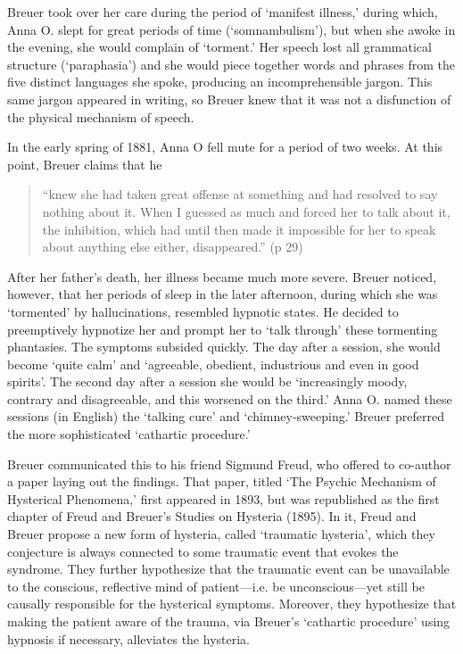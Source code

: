 Breuer took over her care during the period of `manifest illness,' during which, Anna O. slept for great periods of time (`somnambulism'), but when she awoke in the evening, she would complain of `torment.' Her speech lost all grammatical structure (`paraphasia') and she would piece together words and phrases from the five distinct languages she spoke, producing an incomprehensible jargon. This same jargon appeared in writing, so Breuer knew that it was not a disfunction of the physical mechanism of speech.

In the early spring of 1881, Anna O fell mute for a period of two weeks. At this point, Breuer claims that he 

\begin{quote}

``knew she had taken great offense at something and had resolved to say nothing about it. When I guessed as much and forced her to talk about it, the inhibition, which had until then made it impossible for her to speak about anything else either, disappeared.'' (p 29)
\end{quote}

After her father's death, her illness became much more severe. Breuer noticed, however, that her periods of sleep in the later afternoon, during which she was `tormented' by hallucinations, resembled hypnotic states. He decided to preemptively hypnotize her and prompt her to `talk through' these tormenting phantasies. The symptoms subsided quickly. The day after a session, she would become `quite calm' and `agreeable, obedient, industrious and even in good spirits'. The second day after a session she would be `increasingly moody, contrary and disagreeable, and this worsened on the third.' Anna O. named these sessions (in English) the `talking cure' and `chimney-sweeping.' Breuer preferred the more sophisticated `cathartic procedure.'

Breuer communicated this to his friend Sigmund Freud, who offered to co-author a paper laying out the findings. That paper, titled `The Psychic Mechanism of Hysterical Phenomena,' first appeared in 1893, but was republished as the first chapter of Freud and Breuer's Studies on Hysteria (1895). In it, Freud and Breuer propose a new form of hysteria, called `traumatic hysteria', which they conjecture is always connected to some traumatic event that evokes the syndrome. They further hypothesize that the traumatic event can be unavailable to the conscious, reflective mind of patient---i.e. be unconscious---yet still be causally responsible for the hysterical symptoms. Moreover, they hypothesize that making the patient aware of the trauma, via Breuer's `cathartic procedure' using hypnosis if necessary, alleviates the hysteria.

